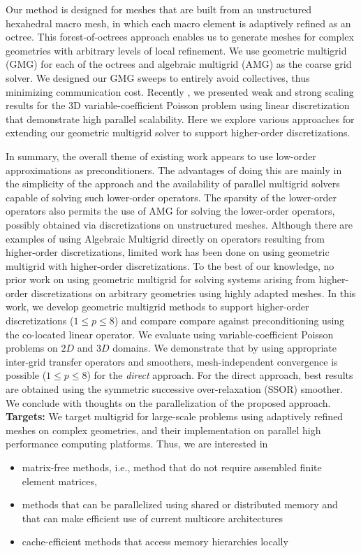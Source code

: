 \documentclass[times]{nlaauth}
\begin{document}
Our method is designed for meshes that are built from an unstructured
hexahedral macro mesh, in which each macro element is adaptively
refined as an octree. This forest-of-octrees approach enables us to
generate meshes for complex geometries with arbitrary levels of local
refinement. We use geometric multigrid (GMG) for each of the octrees
and algebraic multigrid (AMG) as the coarse grid solver. We designed
our GMG sweeps to entirely avoid collectives, thus minimizing
communication cost. Recently \cite{sundar12}, we presented weak and strong scaling
results for the 3D variable-coefficient Poisson problem using linear
discretization that demonstrate high parallel scalability. Here we
explore various approaches for extending our geometric multigrid
solver to support higher-order discretizations.


In summary, the overall theme of existing work appears to use
low-order approximations as preconditioners.  The advantages of doing
this are mainly in the simplicity of the approach and the availability
of parallel multigrid solvers capable of solving such lower-order
operators. The sparsity of the lower-order operators also permits the
use of AMG for solving the lower-order operators, possibly obtained
via discretizations on unstructured meshes.  Although there are
examples of using Algebraic Multigrid directly on operators resulting
from higher-order discretizations, limited work has been done on using
geometric multigrid with higher-order discretizations. To the best of
our knowledge, no prior work on using geometric multigrid for solving
systems arising from higher-order discretizations on arbitrary
geometries using highly adapted meshes.  In this work, we develop
geometric multigrid methods to support higher-order discretizations
($1\le p\le 8$) and compare compare against preconditioning using the
co-located linear operator. We evaluate using variable-coefficient
Poisson problems on $2D$ and $3D$ domains. We demonstrate that by
using appropriate inter-grid transfer operators and smoothers,
mesh-independent convergence is possible ($1\le p\le8$) for the {\em
direct} approach. For the direct approach, best results are obtained
using the symmetric successive over-relaxation (SSOR) smoother. We
conclude with thoughts on the parallelization of the proposed
approach.\\[2ex]



{\bf Targets:} We target multigrid for large-scale problems using
adaptively refined meshes on complex geometries, and their
implementation on parallel high performance computing platforms. Thus,
we are interested in
\begin{itemize}
\item matrix-free methods, i.e., method that do not require assembled
  finite element matrices,
\item methods that can be parallelized using shared or distributed
  memory and that can make efficient use of current multicore
  architectures
\item cache-efficient methods that access memory hierarchies locally
\end{itemize}
\end{document}
